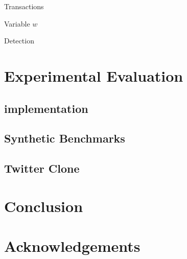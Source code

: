 \documentclass{vldb}
\begin{document}
Transactions

Variable $w$

Detection

\section{Experimental Evaluation}
\label{sec:implement}

\subsection{implementation}

\subsection{Synthetic Benchmarks}

\subsection{Twitter Clone}

\section{Conclusion}

\section*{Acknowledgements}

\balance



\end{document}
